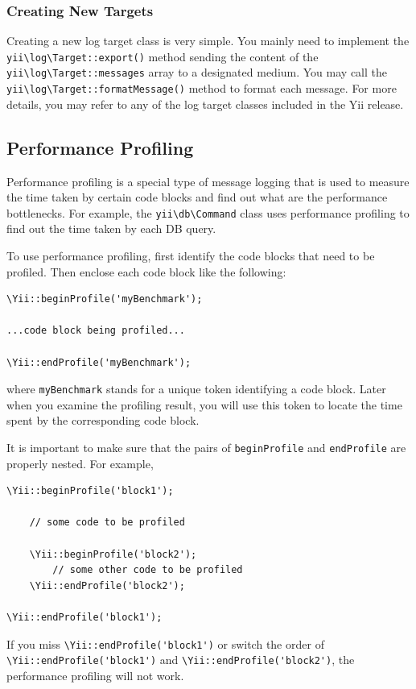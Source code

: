 \subsubsection{Creating New Targets \label{runtime-logging.md::new-targets}}
Creating a new log target class is very simple. You mainly need to implement the \texttt{yii{\allowbreak{}\textbackslash}log{\allowbreak{}\textbackslash}Target\allowbreak{}::\allowbreak{}export()} method
sending the content of the \texttt{yii{\allowbreak{}\textbackslash}log{\allowbreak{}\textbackslash}Target\allowbreak{}::\allowbreak{}messages} array to a designated medium. You may call the
\texttt{yii{\allowbreak{}\textbackslash}log{\allowbreak{}\textbackslash}Target\allowbreak{}::\allowbreak{}formatMessage()} method to format each message. For more details, you may refer to any of the
log target classes included in the Yii release.

\subsection{Performance Profiling \label{runtime-logging.md::performance-profiling}}
Performance profiling is a special type of message logging that is used to measure the time taken by certain
code blocks and find out what are the performance bottlenecks. For example, the \texttt{yii{\allowbreak{}\textbackslash}db{\allowbreak{}\textbackslash}Command} class uses
performance profiling to find out the time taken by each DB query.

To use performance profiling, first identify the code blocks that need to be profiled. Then enclose each
code block like the following:

\lstset{language=php}\begin{lstlisting}
\Yii::beginProfile('myBenchmark');

...code block being profiled...

\Yii::endProfile('myBenchmark');
\end{lstlisting}
where \lstinline|myBenchmark| stands for a unique token identifying a code block. Later when you examine the profiling
result, you will use this token to locate the time spent by the corresponding code block.

It is important to make sure that the pairs of \lstinline|beginProfile| and \lstinline|endProfile| are properly nested.
For example,

\lstset{language=php}\begin{lstlisting}
\Yii::beginProfile('block1');

    // some code to be profiled

    \Yii::beginProfile('block2');
        // some other code to be profiled
    \Yii::endProfile('block2');

\Yii::endProfile('block1');
\end{lstlisting}
If you miss \lstinline|\Yii::endProfile('block1')| or switch the order of \lstinline|\Yii::endProfile('block1')| and
\lstinline|\Yii::endProfile('block2')|, the performance profiling will not work.

